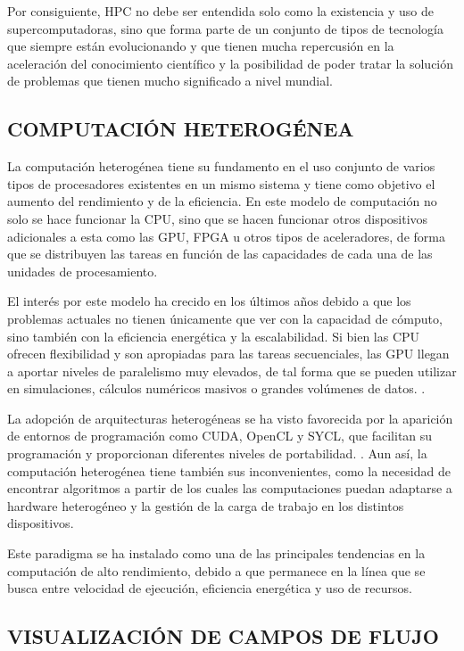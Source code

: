 Por consiguiente, HPC no debe ser entendida solo como la existencia y uso de supercomputadoras, sino que forma parte de un conjunto de tipos de tecnología que siempre están evolucionando y que tienen mucha repercusión en la aceleración del conocimiento científico y la posibilidad de poder tratar la solución de problemas que tienen mucho significado a nivel mundial.


\subsection{COMPUTACIÓN HETEROGÉNEA}

La computación heterogénea tiene su fundamento en el uso conjunto de varios tipos de procesadores existentes en un mismo sistema y tiene como objetivo el aumento del rendimiento y de la eficiencia. En este modelo de computación no solo se hace funcionar la CPU, sino que se hacen funcionar otros dispositivos adicionales a esta como las GPU, FPGA u otros tipos de aceleradores, de forma que se distribuyen las tareas en función de las capacidades de cada una de las unidades de procesamiento.

El interés por este modelo ha crecido en los últimos años debido a que los problemas actuales no tienen únicamente que ver con la capacidad de cómputo, sino también con la eficiencia energética y la escalabilidad. Si bien las CPU ofrecen flexibilidad y son apropiadas para las tareas secuenciales, las GPU llegan a aportar niveles de paralelismo muy elevados, de tal forma que se pueden utilizar en simulaciones, cálculos numéricos masivos o grandes volúmenes de datos. \cite{mittal_survey_2015}.

La adopción de arquitecturas heterogéneas se ha visto favorecida por la aparición de entornos de programación como CUDA, OpenCL y SYCL, que facilitan su programación y proporcionan diferentes niveles de portabilidad. \cite{keryell_sycl_2019}. Aun así, la computación heterogénea tiene también sus inconvenientes, como la necesidad de encontrar algoritmos a partir de los cuales las computaciones puedan adaptarse a hardware heterogéneo y la gestión de la carga de trabajo en los distintos dispositivos.

Este paradigma se ha instalado como una de las principales tendencias en la computación de alto rendimiento, debido a que permanece en la línea que se busca entre velocidad de ejecución, eficiencia energética y uso de recursos.

\subsection{VISUALIZACIÓN DE CAMPOS DE FLUJO}

